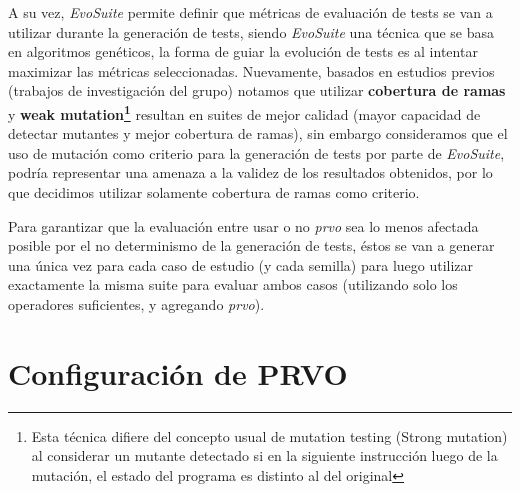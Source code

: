 A su vez, \emph{EvoSuite} permite definir que m\'etricas de evaluaci\'on de tests se van a utilizar durante la generaci\'on de tests, siendo \emph{EvoSuite} una t\'ecnica que se basa en algoritmos gen\'eticos, la forma de guiar la evoluci\'on de tests es al intentar maximizar las m\'etricas seleccionadas. Nuevamente, basados en estudios previos (trabajos de investigaci\'on del grupo) notamos que utilizar \textbf{cobertura de ramas} y \textbf{weak mutation\footnote{Esta t\'ecnica difiere del concepto usual de mutation testing (Strong mutation) al considerar un mutante detectado si en la siguiente instrucci\'on luego de la mutaci\'on, el estado del programa es distinto al del original}} resultan en suites de mejor calidad (mayor capacidad de detectar mutantes y mejor cobertura de ramas), sin embargo consideramos que el uso de mutaci\'on como criterio para la generaci\'on de tests por parte de \emph{EvoSuite}, podr\'ia representar una amenaza a la validez de los resultados obtenidos, por lo que decidimos utilizar solamente cobertura de ramas como criterio.

Para garantizar que la evaluaci\'on entre usar o no \emph{prvo} sea lo menos afectada posible por el no determinismo de la generaci\'on de tests, \'estos se van a generar una \'unica vez para cada caso de estudio (y cada semilla) para luego utilizar exactamente la misma suite para evaluar ambos casos (utilizando solo los operadores suficientes, y agregando \emph{prvo}).

\section{Configuraci\'on de PRVO}
\label{sec:evaluation.prvoconfig}

